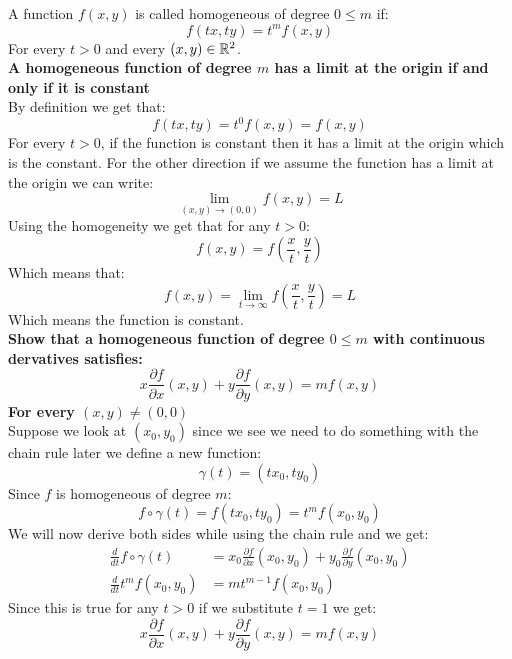 \documentclass[11pt,a4paper]{article}
\begin{document}
	\newpage
	
	A function $f(x,y)$ is called homogeneous of degree $0 \le m$ if:
	\[
		f(tx,ty) = t^m f(x,y)
	\]
	For every $t > 0$ and every $(x,y) \in \mathbb{R}^2$. \\
	\textbf{A homogeneous function of degree $m$ has a limit at the origin
	if and only if it is constant} \\
	By definition we get that:
	\[
		f(tx,ty) = t^0 f(x,y) = f(x,y)
	\]
	For every $t > 0$, if the function is constant then it has a limit
	at the origin which is the constant. For the other direction if
	we assume the function has a limit at the origin we can write:
	\[
		\lim_{(x,y)\to(0,0)}{f(x,y)} = L
	\]
	Using the homogeneity we get that for any $t > 0$:
	\[
		f(x,y) = f\left(\frac{x}{t},\frac{y}{t}\right)
	\]
	Which means that:
	\[
		f(x,y) = \lim_{t\to\infty}{f\left(\frac{x}{t},\frac{y}{t}\right)} = L
	\]
	Which means the function is constant. \\
	\textbf{Show that a homogeneous function of degree $0 \le m$ with
	continuous dervatives satisfies:
	\[
		x \frac{\partial f}{\partial x}(x,y) + 
		y \frac{\partial f}{\partial y}(x,y) = 
		mf(x,y)
	\]
	For every $(x,y) \neq (0,0)$} \\
	Suppose we look at $(x_0,y_0)$ since we see we need to do something
	with the chain rule later we define a new function:
	\[
		\gamma(t) = (tx_0,ty_0)
	\]
	Since $f$ is homogeneous of degree $m$:
	\[
		f\circ\gamma(t) = f(tx_0,ty_0) = t^mf(x_0,y_0)
	\]
	We will now derive both sides while using the chain rule and we get:
	\begin{align*}
		\frac{d}{dt}f\circ\gamma(t) &= 
		x_0 \frac{\partial f}{\partial x}(x_0,y_0) + 
		y_0 \frac{\partial f}{\partial y}(x_0,y_0) \\
		\frac{d}{dt}t^mf(x_0,y_0) &= mt^{m-1}f(x_0,y_0)
	\end{align*}
	Since this is true for any $t > 0$ if we substitute $t = 1$ we get:
	\[
		x \frac{\partial f}{\partial x}(x,y) + 
		y \frac{\partial f}{\partial y}(x,y) = 
		mf(x,y)
	\]
	
	\newpage

	
\end{document}
